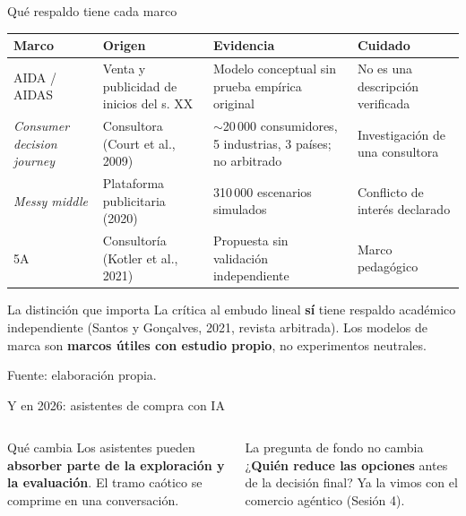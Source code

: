 \documentclass[aspectratio=169,xcolor=dvipsnames]{beamer}
\newcommand{\fuente}[1]{{\tiny\color{IPNgris}Fuente: #1}}
\begin{document}
\begin{frame}{Qué respaldo tiene cada marco}
\scriptsize
\begin{center}
\begin{tabular}{@{}>{\raggedright}p{2.2cm}>{\raggedright}p{2.7cm}>{\raggedright}p{3.2cm}>{\raggedright\arraybackslash}p{2.6cm}@{}}
\toprule
\textbf{Marco} & \textbf{Origen} & \textbf{Evidencia} & \textbf{Cuidado} \\
\midrule
AIDA / AIDAS & Venta y publicidad de inicios del s. XX & Modelo conceptual sin prueba empírica original & No es una descripción verificada \\
\textit{Consumer decision journey} & Consultora (Court et al., 2009) & ${\sim}$20\,000 consumidores, 5 industrias, 3 países; no arbitrado & Investigación de una consultora \\
\textit{Messy middle} & Plataforma publicitaria (2020) & 310\,000 escenarios simulados & Conflicto de interés declarado \\
5A & Consultoría (Kotler et al., 2021) & Propuesta sin validación independiente & Marco pedagógico \\
\bottomrule
\end{tabular}
\end{center}
\vspace{2pt}
\begin{alertblock}{La distinción que importa}
  \scriptsize La crítica al embudo lineal \textbf{sí} tiene respaldo académico independiente (Santos y Gonçalves, 2021, revista arbitrada). Los modelos de marca son \textbf{marcos útiles con estudio propio}, no experimentos neutrales.
\end{alertblock}
\fuente{elaboración propia.}
\end{frame}

\begin{frame}{Y en 2026: asistentes de compra con IA}
\begin{columns}[T]
  \begin{block}{Qué cambia}
    \small Los asistentes pueden \textbf{absorber parte de la exploración y la evaluación}. El tramo caótico se comprime en una conversación.
  \end{block}
  \begin{alertblock}{La pregunta de fondo no cambia}
    \small ¿\textbf{Quién reduce las opciones} antes de la decisión final? Ya la vimos con el comercio agéntico (Sesión 4).
  \end{alertblock}
\end{columns}
\end{frame}
\end{document}
